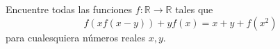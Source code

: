 Encuentre todas las funciones $f : \mathbb{R} \rightarrow \mathbb{R}$ tales que
\[ f(x f(x-y)) + yf(x) = x + y + f(x^2) \]
para cualesquiera números reales $x,y$.
